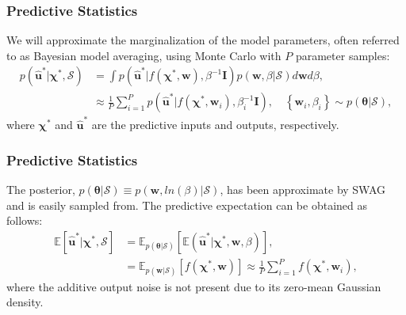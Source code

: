 \documentclass{beamer}
\theoremstyle{remark}
\begin{document}
\begin{frame}
\frametitle{Predictive Statistics}
We will approximate the marginalization of the model parameters, often referred to as Bayesian model averaging, using Monte Carlo with $P$ parameter samples:
\begin{align}
   p\left(\hat{\bm{u}}^{*}|\bm{\chi}^{*},\mathcal{S}\right)&=\int p\left(\hat{\bm{u}}^{*}|f\left(\bm{\chi}^{*},\textbf{w}\right) ,\beta^{-1}\bm{I}\right)p\left(\textbf{w},\beta|\mathcal{S}\right)d\textbf{w}d\beta,  \nonumber \\
    &\approx \frac{1}{P}\sum_{i=1}^{P}p\left(\hat{\bm{u}}^{*}|f\left(\bm{\chi}^{*},\textbf{w}_{i}\right) ,\beta_{i}^{-1}\bm{I}\right), \quad \left\{\textbf{w}_{i},\beta_{i}\right\} \sim p\left(\bm{\theta}|\mathcal{S}\right),
\end{align}
where $\bm{\chi}^{*}$ and $\hat{\bm{u}}^{*}$ are the predictive inputs and outputs, respectively.
\end{frame}

\begin{frame}
\frametitle{Predictive Statistics}
The posterior, $p(\bm{\theta}|\mathcal{S}) \equiv p(\textbf{w}, ln(\beta)|\mathcal{S})$, has been approximate by SWAG and is easily sampled from.
The predictive expectation can be obtained as follows:
\begin{align}
    \mathbb{E}\left[\hat{\bm{u}}^{*}|\bm{\chi}^{*},\mathcal{S}\right]&=\mathbb{E}_{p\left(\bm{\theta}|\mathcal{S}\right)}\left[\mathbb{E}\left(\hat{\bm{u}}^{*}|\bm{\chi}^{*},\textbf{w},\beta\right)\right],  \nonumber  \\
    &=\mathbb{E}_{p\left(\textbf{w}|\mathcal{S}\right)}\left[f\left(\bm{\chi}^{*},\textbf{w}\right)\right] \approx \frac{1}{P}\sum_{i=1}^{P}f\left(\bm{\chi}^{*},\textbf{w}_{i}\right),
    \label{eq:predictive-mean}
\end{align}
where the additive output noise is not present due to its zero-mean Gaussian density.
\end{frame}
\end{document}
